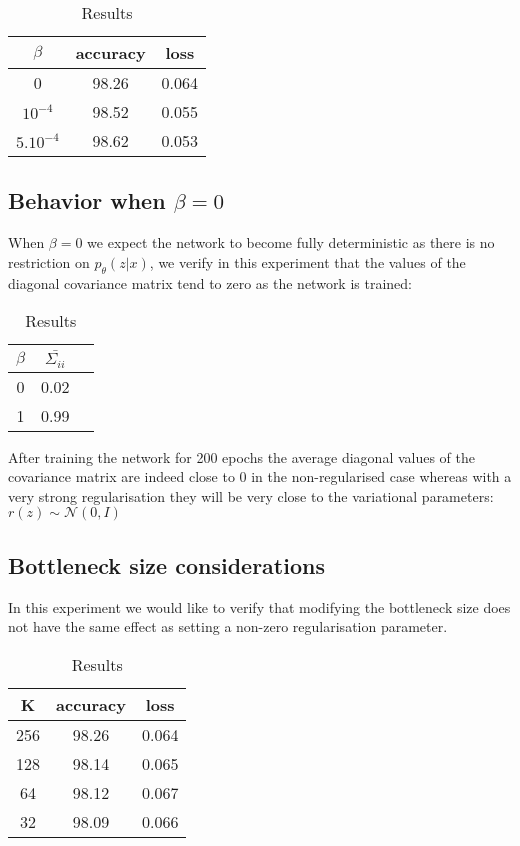 \documentclass[10pt,oneside,openright]{report}
\begin{document}
\begin {table}[H]
\begin{center}
\begin{tabular}{ c | c c }
 $\beta$ & accuracy & loss\\
  \hline
0 & 98.26 & 0.064\\
$10^{-4}$ & 98.52 & 0.055\\
$5.10^{-4}$ & 98.62 & 0.053 \\
\end{tabular}
\end{center}
\caption{Results}
\end {table}

\subsection{Behavior when $\beta = 0$}
When $\beta = 0$ we expect the network to become fully deterministic as there is no restriction on $p_\theta(z|x)$, we verify in this experiment that the values of the diagonal covariance matrix tend to zero as the network is trained:

\begin {table}[H]
\begin{center}
\begin{tabular}{ c | c c }
 $\beta$ & $\bar{\Sigma_{ii}}$ \\
 \hline
0 & 0.02\\
1 & 0.99 \\
\end{tabular}
\end{center}
\caption{Results}
\end {table}

After training the network for 200 epochs the average diagonal values of the covariance matrix are indeed close to 0 in the non-regularised case whereas with a very strong regularisation they will be very close to the variational parameters: $r(z) \sim \mathcal{N}(0, I)$

\subsection{Bottleneck size considerations}
In this experiment we would like to verify that modifying the bottleneck size does not have the same effect as setting a non-zero regularisation parameter.

\begin {table}[H]
\begin{center}
\begin{tabular}{ c | c c }
 K & accuracy & loss \\
 \hline
256 & 98.26 & 0.064 \\
128 & 98.14 & 0.065 \\
64 & 98.12& 0.067 \\
32 & 98.09 & 0.066 \\
\end{tabular}
\end{center}
\caption{Results}
\end {table}
\end{document}
